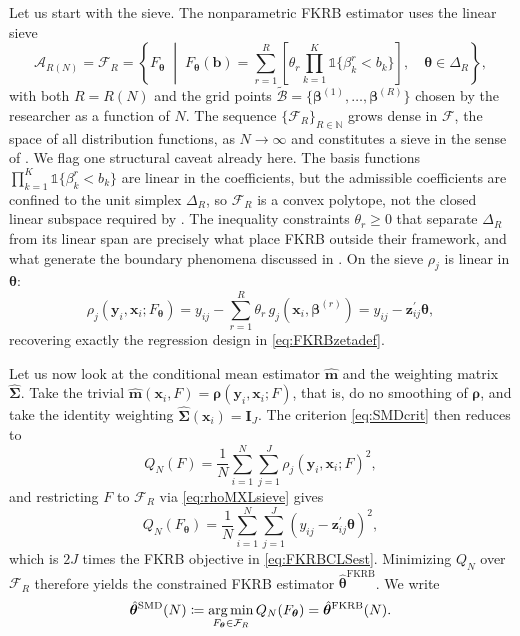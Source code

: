 Let us start with the sieve.
The nonparametric FKRB estimator uses the linear sieve
\begin{equation}
\label{eq:FKRBsieve}
    \mathcal{A}_{R(N)} = \mathcal{F}_{R} = \left\{F_{\bm{\theta}} \;\middle|\; F_{\bm{\theta}}(\bm{b}) = \sum_{r=1}^{R} \left[\theta_r\prod_{k=1}^{K}\mathds{1}{\{\beta^{r}_k < b_k\}}\right]\!, \quad \bm{\theta} \in \Delta_{R}\right\},
\end{equation}
with both $R = R(N)$ and the grid points $\tilde{\mathcal{B}} = \{\bm{\beta}^{(1)}, \ldots, \bm{\beta}^{(R)}\}$ chosen by the researcher as a function of $N$. 
The sequence $\{\mathcal{F}_R\}_{R\in\mathbb{N}}$ grows dense in $\mathcal{F}$, the space of all distribution functions, as $N\to\infty$ and constitutes a sieve in the sense of \citet{Chen2007}.
We flag one structural caveat already here.
The basis functions $\prod_{k=1}^{K}\mathds{1}\{\beta^{r}_k < b_k\}$ are linear in the coefficients, but the admissible coefficients are confined to the unit simplex $\Delta_R$, so $\mathcal{F}_R$ is a convex polytope, not the closed linear subspace required by \citet[][Assumption~3.1(ii)]{ChenPouzo2015}.
The inequality constraints $\theta_r\ge 0$ that separate $\Delta_R$ from its linear span are precisely what place FKRB outside their framework, and what generate the boundary phenomena discussed in .
On the sieve $\rho_j$ is linear in $\bm{\theta}$:
\begin{equation}
\label{eq:rhoMXLsieve}
    \rho_j(\bm{y}_i, \bm{x}_i; F_{\bm{\theta}}) = y_{ij} - \sum_{r=1}^R \theta_r\, g_j(\bm{x}_i, \bm{\beta}^{(r)}) = y_{ij} - \bm{z}_{ij}^\prime \bm{\theta},
\end{equation}
recovering exactly the regression design in \cref{eq:FKRBzetadef}.

Let us now look at the conditional mean estimator $\hat{\bm{m}}$ and the weighting matrix $\hat{\bm{\Sigma}}$.
Take the trivial $\hat{\bm{m}}(\bm{x}_i, F) = \bm{\rho}(\bm{y}_i, \bm{x}_i; F)$, that is, do no smoothing of $\bm{\rho}$, and take the identity weighting $\hat{\bm{\Sigma}}(\bm{x}_i) = \bm{I}_J$.
The criterion \cref{eq:SMDcrit} then reduces to
\begin{equation}
\label{eq:FKRBPSMDcrit}
    Q_N(F) = \frac{1}{N}\sum_{i=1}^N\sum_{j=1}^J \rho_j(\bm{y}_i,\bm{x}_i; F)^2,
\end{equation}
and restricting $F$ to $\mathcal{F}_R$ via \cref{eq:rhoMXLsieve} gives
\begin{equation}
\label{eq:FKRBPSMDcritsieve}
    Q_N(F_{\bm{\theta}}) = \frac{1}{N}\sum_{i=1}^N\sum_{j=1}^J (y_{ij} - \bm{z}_{ij}^\prime\bm{\theta})^2,
\end{equation}
which is $2J$ times the FKRB objective in \cref{eq:FKRBCLSest}.
Minimizing $Q_N$ over $\mathcal{F}_R$ therefore yields the constrained FKRB estimator $\hat{\bm{\theta}}^{\mathrm{FKRB}}$.
We write
\begin{equation}
\label{eq:SMDdef}
    \hat{\bm{\theta}}^{\mathrm{SMD}}(N) \coloneq \operatorname*{arg\,min}_{F_{\bm{\theta}} \in \mathcal{F}_R} {Q_N(F_{\bm{\theta}})} = \hat{\bm{\theta}}^{\mathrm{FKRB}}(N).
\end{equation}

